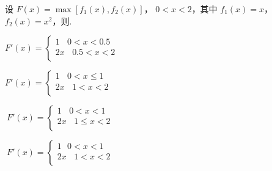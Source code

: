 \begin{problem}设
$F\left( x \right) = \max\left[ f_{1}\left( x \right),f_{2}(x)\right]$，
$0 < x < 2$，其中 $f_{1}(x) = x$， $f_{2}(x) = x^{2}$，则.

\begin{abcd} \item $F'(x) = \left\{ \begin{matrix}
 1\ \ \ \  0 < x < 0.5 \\
 2x\ \ \ \  0.5 < x < 2 \\
\end{matrix} \right.\ $

\item $F'(x) = \left\{ \begin{matrix}
 1\ \ \ \  0 < x \leq 1 \\
 2x\ \ \ \  1 < x < 2 \\
\end{matrix} \right.\ $

\item $\ F'(x) = \left\{ \begin{matrix}
 1\ \ \ \  0 < x < 1 \\
 2x\ \ \ \  1 \leq x < 2 \\
\end{matrix} \right.\ $

\item $\ F'(x) = \left\{ \begin{matrix}
 1\ \ \  0 < x < 1 \\
 2x\ \ \ \  1 < x < 2 \\
\end{matrix} \right.\ $

\end{abcd}



\end{problem}


